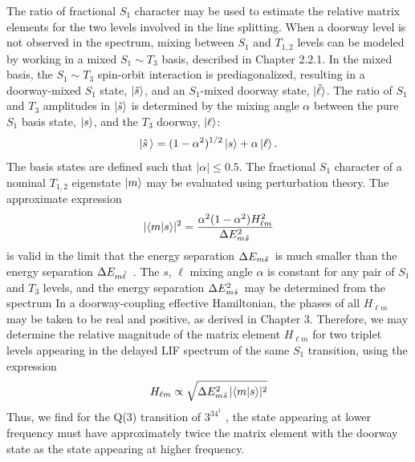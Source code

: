 \documentclass[12pt]{mitthesis}
\begin{document}
The ratio of fractional $S_1$ character may be used to estimate the
relative matrix elements for the two levels involved in the line
splitting.  When a doorway level is not observed in the spectrum,
mixing between $S_1$ and $T_{1,2}$ levels can be modeled by working in
a mixed $S_1 \sim T_3$ basis, described in Chapter 2.2.1.
  In the mixed basis, the $S_1 \sim T_3$
spin-orbit interaction is prediagonalized, resulting in a
doorway-mixed $S_1$ state, $\mathinner{|{\tilde{s}}\rangle}$, and an $S_1$-mixed
doorway state, $\mathinner{|{\tilde{\ell}}\rangle}$.  The ratio of $S_1$ and $T_3$
amplitudes in $\mathinner{|{\tilde{s}}\rangle}$ is determined by the mixing angle
$\alpha$ between the pure $S_1$ basis state, $\mathinner{|{s}\rangle}$, and the $T_3$
doorway, $\mathinner{|{\ell}\rangle}$:
\begin{equation}
  \mathinner{|{\tilde{s}\,}\rangle} = (1-\alpha^2)^{1/2} \mathinner{|{s}\rangle} + \alpha \mathinner{|{\ell}\rangle}.
\end{equation}
The basis states are defined such that $\lvert \alpha \rvert \leq 0.5$.
The fractional $S_1$ character of a nominal $T_{1,2}$ eigenstate
$\mathinner{|{m}\rangle}$ may be evaluated using perturbation theory.  The approximate expression
\begin{equation}
  \lvert \mathinner{\langle{m|s}\rangle} \rvert^2 = 
  \frac{\alpha^2 (1-\alpha^2) H_{\ell m}^2}{\Delta E_{m \tilde{s}\,}^2}
\end{equation}
is valid in the limit that the energy separation $\Delta E_{m \tilde{s}\,}$ is
much smaller than the energy separation $\Delta E_{m \tilde{\ell}\,}$ .  The $s$, $\ell$ mixing angle $\alpha$ is constant for
any pair of $S_1$ and $T_3$ levels, and the energy separation $\Delta
E_{m \tilde{s}\,}^2$ may be determined from the spectrum   In
a doorway-coupling effective Hamiltonian, the phases of all $H_{\ell
  m}$ may be taken to be real and positive, as derived in Chapter 3.
Therefore, we may determine the relative magnitude of the matrix
element $H_{\ell m}$ for two triplet levels appearing in the delayed
LIF spectrum of the same $S_1$ transition, using the expression
\begin{equation}
  \label{eq:approx-hlm}
  H_{\ell m} \propto \sqrt{ \Delta E_{m \tilde{s}\,}^2 \lvert \mathinner{\langle{m|s}\rangle} \rvert^2 }
\end{equation}
Thus, we find for the Q(3) transition of $3^34^1$ , the state
appearing at lower frequency must have approximately twice the matrix
element with the doorway state as the state appearing at higher
frequency.
\end{document}
